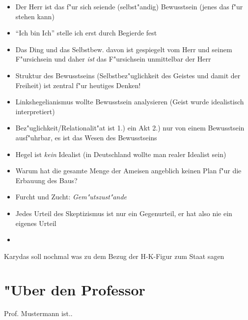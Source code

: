 \documentclass[emulatestandardclasses]{scrartcl}
\begin{document}
\begin{itemize}
  \item Der Herr ist das f"ur sich seiende (selbst"andig) Bewusstsein (jenes das f"ur stehen kann)
  \item "`Ich bin Ich"' stelle ich erst durch Begierde fest
  \item Das Ding und das Selbstbew. davon ist gespiegelt vom Herr und seinem F"ursichsein und daher \emph{ist} das F"ursichsein unmittelbar der Herr
  \item Struktur des Bewusstseins (Selbstbez"uglichkeit des Geistes und damit der Freiheit) ist zentral f"ur heutiges Denken!
  \item Linkshegelianismus wollte Bewusstsein analysieren (Geist wurde idealistisch interpretiert) 
  \item Bez"uglichkeit/Relationalit"at ist 1.) ein Akt 2.) nur von einem Bewusstsein ausf"uhrbar, es ist das Wesen des Bewusstseins
  \item Hegel ist \emph{kein} Idealist (in Deutschland wollte man realer Idealist sein)
  \item Warum hat die gesamte Menge der Ameisen angeblich keinen Plan f"ur die Erbauung des Baus?
  \item Furcht und Zucht: \emph{Gem"utszust"ande}
  \item  Jedes Urteil des Skeptizismus ist nur ein Gegenurteil, er hat also nie ein eigenes Urteil
  \item 
\end{itemize}

Karydas soll nochmal was zu dem Bezug der H-K-Figur zum Staat sagen

\newpage
\section{"Uber den Professor}
Prof. Mustermann ist..


\end{document}

